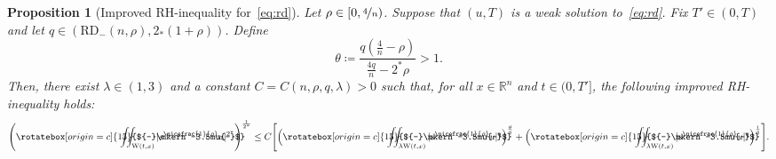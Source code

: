 \documentclass[11pt, leqno]{amsart}
\newtheorem{proposition}[theorem]{Proposition}
\theoremstyle{definition}
\newcommand{\R}{\mathbb{R}}
\newcommand{\W}{\mathrm{W}}
\newcommand{\WB}{\mathrm{W}}
\newcommand{\RD}{\mathrm{RD}}
\def\Yint#1{\mathchoice
	{\YYint\displaystyle\textstyle{#1}}%
	{\YYint\textstyle\scriptstyle{#1}}%
	{\YYint\scriptstyle\scriptscriptstyle{#1}}%
	{\YYint\scriptscriptstyle\scriptscriptstyle{#1}}%
	\!\iint}
\def\YYint#1#2#3{{\setbox0=\hbox{$#1{#2#3}{\iint}$}
		\vcenter{\hbox{$#2#3$}}\kern-.51\wd0}}
\def\longdash{{-}\mkern-3.5mu{-}}
\def\tiltlongdash{\rotatebox[origin=c]{15}{$\longdash$}}
\def\tiltfiint{\Yint\longdash}
\def\tiltfiint{\Yint\tiltlongdash}
\begin{document}
	\begin{proposition}[Improved RH-inequality for~\eqref{eq:rd}]
		\label{prop:rh_rd_improved}
		Let $\rho \in [0, \nicefrac{4}{n})$. Suppose that $(u,T)$ is a weak solution to~\eqref{eq:rd}. Fix $T' \in (0,T)$ and let $q \in (\RD_{-}(n,\rho), 2_*(1+\rho))$.
		Define $$\theta \coloneqq \frac{q(\tfrac{4}{n} - \rho)}{\tfrac{4q}{n} - 2^* \rho} > 1.$$
		Then, there exist $\lambda \in (1,3)$ and a constant $C = C(n,\rho,q,\lambda) > 0$ such that, for all $x\in \R^n$ and $t \in (0, T']$, the following improved RH-inequality holds:
		\begin{align}
			\left( \tiltfiint_{\W(t,x)} |s^{\nicefrac{1}{\rho}} u|^{2^*} \right)^\frac{1}{2^*}
			\leq{} C \Biggl[ \Bigl( \tiltfiint_{\lambda \WB(t,x)} |s^{\nicefrac{1}{\rho}} u|^q \Bigr)^\frac{\theta}{q} + \Bigl( \tiltfiint_{\lambda \WB(t,x)} |s^{\nicefrac{1}{\rho}} u|^q \Bigr)^\frac{1}{q} \Biggr].
		\end{align}
	\end{proposition}
\end{document}
